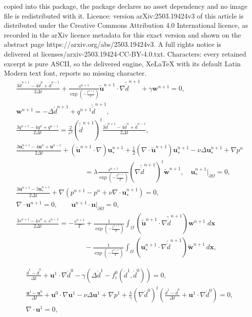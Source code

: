 \documentclass[10pt,a4paper]{amsart}
\newcommand{\bx}{\mathrm{\textbf{x}}}
\newcommand{\dd}{\ensuremath{\acute d}}
\newcommand{\nn}{\textbf{n}}
\newcommand{\uu}{\mathrm{\textbf{u}}}
\newcommand{\ww}{\mathrm{\textbf{w}}}
\begin{document}
copied into this package, the package declares no asset dependency and no image file is redistributed with it. Licence: version arXiv:2503.19424v3 of this article is distributed under the Creative Commons Attribution 4.0 International licence, as recorded in the arXiv licence metadata for this exact version and shown on the abstract page https://arxiv.org/abs/2503.19424v3. A full rights notice is delivered at licenses/arxiv-2503.19424-CC-BY-4.0.txt. Characters: every retained excerpt is pure ASCII, so the delivered engine, XeLaTeX with its default Latin Modern text font, reports no missing character.
\begin{align}
&\frac{3\dd^{n+1}-4\dd^{n}+\dd^{n-1}}{2\Delta t}+\frac{s^{n+1}}{\exp\left(-\frac{t^{n+1}}{T}\right)} \tilde{\uu}^{n+1}\cdot\nabla \tilde{\dd}^{n+1} +\gamma\ww^{n+1}=0,\label{eq:2stPCSAV2}\\
&\ww^{n+1} = -\Delta\dd^{n+1}+q^{n+1}\tilde{\dd}^{n+1},\label{eq:2weq}\\
&\frac{3q^{n+1}-4q^{n}+q^{n-1}}{2\Delta t}=\frac{2}{\varepsilon^2}\left( \tilde{\dd}^{n+1}\right)^t \frac{3\dd^{n+1}-4\dd^{n}+\dd^{n-1}}{2\Delta t}, \label{eq:2stPCSAV3}\\
&\frac{3\uu_*^{n+1}-4\uu^{n}+\uu^{n-1}}{2\Delta t}+
\left(\tilde{\uu}^{n+1}\cdot\nabla\right)\uu_*^{n+1}+\frac{1}{2}\left(\nabla\cdot\tilde{\uu}^{n+1}\right)\uu_*^{n+1}
-\nu\Delta\uu_*^{n+1}+\nabla p^{n} \nonumber \\
&\qquad\qquad\qquad\qquad\qquad =\lambda\frac{s^{n+1}}{\exp\left(-\frac{t^{n+1}}{T}\right)} \left(\nabla\tilde{\dd}^{n+1}\right)^t \tilde{\ww}^{n+1},\quad\uu_*^{n+1}|_{\partial\Omega}=0,\label{eq:2stPCSAV4}\\
&\frac{3\uu^{n+1}-3\uu_*^{n+1}}{2\Delta t}
+\nabla\left(p^{n+1}-p^n+\nu\nabla\cdot\uu_*^{n+1}\right)=0,\label{eq:2stPCSAV5}\\
&\nabla\cdot\uu^{n+1}=0,\qquad \uu^{n+1}\cdot\nn|_{\partial\Omega}=0,\label{eq:nabu0}\\
&\frac{3s^{n+1}-4s^{n}+s^{n-1}}{2\Delta t}
= -\frac{s^{n+1}}{T} + \frac{1}{\exp\left(-\frac{t^{n+1}}{T}\right)} \int_{\Omega}\left(\tilde{\uu}^{n+1}\cdot \nabla\tilde{\dd}^{n+1}\right)\ww^{n+1}\;d\bx\nonumber\\
&\qquad\qquad\qquad\quad\quad\quad\quad-\frac{1}{\exp\left(-\frac{t^{n+1}}{T}\right)} \int_{\Omega}\left(\uu_*^{n+1}\cdot \nabla\tilde{\dd}^{n+1}\right)\tilde{\ww}^{n+1} \, d\bx,\label{eq:2stPCSAV6}
\end{align}

\begin{align}
&\frac{\dd^{1}-\dd^{0}}{\Delta t}+ \uu^{1}\cdot \nabla \dd^{0}-\gamma\left( \Delta \dd^{1}-f_{\varepsilon}^0(\dd^{1}, \dd^{0})\right)=0,\label{initial01}\\
&\frac{\uu^{1}-\uu^{0}}{\Delta t}+ \uu^{0}\cdot\nabla \uu^{1}-\nu \Delta \uu^{1}+\nabla p^{1} +\frac{\lambda}{\gamma}\left(\nabla\dd^{0}\right)^t\left(\frac{\dd^{1}-\dd^{0}}{\Delta t}+ \uu^{1}\cdot \nabla \dd^{0}\right)=0,\label{initial03}\\
&\nabla \cdot \uu^{1}=0,\label{initial04}
\end{align}
\end{document}
